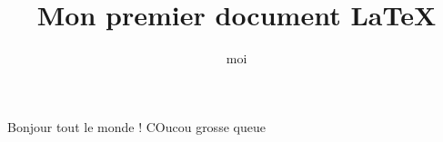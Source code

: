 \documentclass{report}
\title{Mon premier document \LaTeX}
\author{moi}
\begin{document}
\maketitle
Bonjour tout le monde !
COucou grosse queue

\newpage
\end{document}
